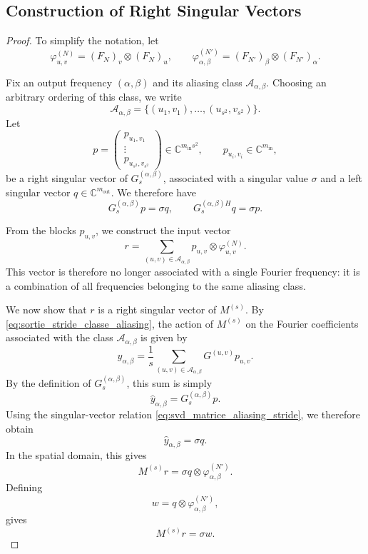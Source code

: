 \subsection{Construction of Right Singular Vectors}

\begin{proof}

To simplify the notation, let
\[
    \varphi_{u,v}^{(N)}
    =
    (F_N)_v \otimes (F_N)_u,
    \qquad
    \varphi_{\alpha,\beta}^{(N')}
    =
    (F_{N'})_\beta \otimes (F_{N'})_\alpha.
\]

Fix an output frequency $(\alpha,\beta)$ and its aliasing class
$\mathcal{A}_{\alpha,\beta}$. Choosing an arbitrary ordering of this class,
we write
\[
    \mathcal{A}_{\alpha,\beta}
    =
    \{(u_1,v_1),\dots,(u_{s^2},v_{s^2})\}.
\]
Let
\[
    p
    =
    \begin{pmatrix}
        p_{u_1,v_1} \\
        \vdots \\
        p_{u_{s^2},v_{s^2}}
    \end{pmatrix}
    \in \mathbb{C}^{m_{\mathrm{in}}s^2},
    \qquad
    p_{u_i,v_i}\in\mathbb{C}^{m_{\mathrm{in}}},
\]
be a right singular vector of $G_s^{(\alpha,\beta)}$, associated with a singular value
$\sigma$ and a left singular vector $q\in\mathbb{C}^{m_{\mathrm{out}}}$. We therefore have
\begin{equation}
    G_s^{(\alpha,\beta)}p
    =
    \sigma q,
    \qquad
    G_s^{(\alpha,\beta)H}q
    =
    \sigma p.
    \label{eq:svd_matrice_aliasing_stride}
\end{equation}

From the blocks $p_{u,v}$, we construct the input vector
\begin{equation}
    r
    =
    \sum_{(u,v)\in\mathcal{A}_{\alpha,\beta}}
    p_{u,v}\otimes \varphi_{u,v}^{(N)}.
    \label{eq:construction_vecteur_singulier_stride}
\end{equation}
This vector is therefore no longer associated with a single Fourier frequency: it is a combination
of all frequencies belonging to the same aliasing class.

We now show that $r$ is a right singular vector of $M^{(s)}$. By
\eqref{eq:sortie_stride_classe_aliasing}, the action of $M^{(s)}$ on the Fourier coefficients
associated with the class $\mathcal{A}_{\alpha,\beta}$ is given by
\[
    \widehat{y}_{\alpha,\beta}
    =
    \frac{1}{s}
    \sum_{(u,v)\in\mathcal{A}_{\alpha,\beta}}
    G^{(u,v)}p_{u,v}.
\]
By the definition of $G_s^{(\alpha,\beta)}$, this sum is simply
\[
    \widehat{y}_{\alpha,\beta}
    =
    G_s^{(\alpha,\beta)}p.
\]
Using the singular-vector relation \eqref{eq:svd_matrice_aliasing_stride}, we therefore obtain
\[
    \widehat{y}_{\alpha,\beta}
    =
    \sigma q.
\]
In the spatial domain, this gives
\[
    M^{(s)}r
    =
    \sigma q\otimes \varphi_{\alpha,\beta}^{(N')}.
\]
Defining
\[
    w
    =
    q\otimes \varphi_{\alpha,\beta}^{(N')},
\]
gives
\begin{equation}
    M^{(s)}r = \sigma w.
    \label{eq:relation_singuliere_stride_droite}
\end{equation}


\end{proof}
